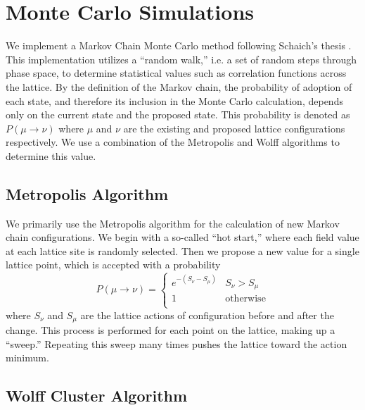 \documentclass[12pt]{report}
\begin{document}
\section{Monte Carlo Simulations}
\label{sec:mc}

We implement a Markov Chain Monte Carlo method following Schaich's thesis \cite{schaich2006}. This implementation utilizes a ``random walk,'' i.e. a set of random steps through phase space, to determine statistical values such as correlation functions across the lattice. By the definition of the Markov chain, the probability of adoption of each state, and therefore its inclusion in the Monte Carlo calculation, depends only on the current state and the proposed state. This probability is denoted as $P(\mu\rightarrow\nu)$ where $\mu$ and $\nu$ are the existing and proposed lattice configurations respectively. We use a combination of the Metropolis and Wolff algorithms to determine this value.

\subsection{Metropolis Algorithm}
We primarily use the Metropolis algorithm for the calculation of new Markov chain configurations. We begin with a so-called ``hot start,'' where each field value at each lattice site is randomly selected. Then we propose a new value for a single lattice point, which is accepted with a probability
\begin{equation}
    P(\mu\rightarrow\nu) = \begin{cases} 
        e^{-(S_\nu - S_\mu)} & S_\nu > S_\mu \\
        1 & \mathrm{otherwise} \\
   \end{cases}
\end{equation}
where $S_\nu$ and $S_\mu$ are the lattice actions of configuration before and after the change. This process is performed for each point on the lattice, making up a ``sweep.'' Repeating this sweep many times pushes the lattice toward the action minimum.

\subsection{Wolff Cluster Algorithm}
\end{document}
